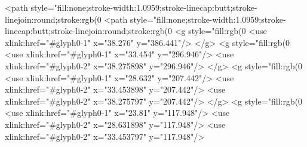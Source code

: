 <path style="fill:none;stroke-width:1.0959;stroke-linecap:butt;stroke-linejoin:round;stroke:rgb(0%
<path style="fill:none;stroke-width:1.0959;stroke-linecap:butt;stroke-linejoin:round;stroke:rgb(0%
<g style="fill:rgb(0%
  <use xlink:href="#glyph0-1" x="38.276" y="386.441"/>
</g>
<g style="fill:rgb(0%
  <use xlink:href="#glyph0-1" x="33.454" y="296.946"/>
  <use xlink:href="#glyph0-2" x="38.275898" y="296.946"/>
</g>
<g style="fill:rgb(0%
  <use xlink:href="#glyph0-1" x="28.632" y="207.442"/>
  <use xlink:href="#glyph0-2" x="33.453898" y="207.442"/>
  <use xlink:href="#glyph0-2" x="38.275797" y="207.442"/>
</g>
<g style="fill:rgb(0%
  <use xlink:href="#glyph0-1" x="23.81" y="117.948"/>
  <use xlink:href="#glyph0-2" x="28.631898" y="117.948"/>
  <use xlink:href="#glyph0-2" x="33.453797" y="117.948"/>
